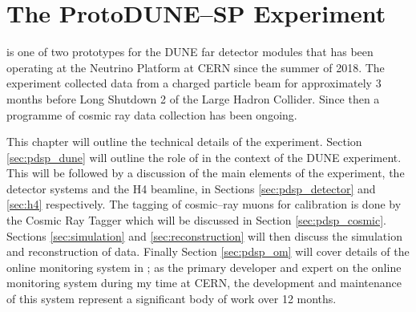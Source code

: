 \chapter{\label{ch:protodune}The ProtoDUNE--SP Experiment} 

\minitoc

%
% 

\protodune{} is one of two prototypes for the DUNE far detector modules that has
been operating at the Neutrino Platform at CERN since the summer of 2018. The
experiment collected data from a charged particle beam for approximately 3 
months before Long Shutdown 2 of the Large Hadron Collider. Since then a 
programme of cosmic ray data collection has been ongoing.

This chapter will outline the technical details of the \protodune{} experiment.
Section \ref{sec:pdsp_dune} will outline the role of \protodune{} in the context
of the DUNE experiment. This will be followed by a discussion of the main
elements of the experiment, the \protodune{} detector systems and the H4
beamline, in Sections \ref{sec:pdsp_detector} and \ref{sec:h4} respectively.
The tagging of cosmic--ray muons for calibration is done by the Cosmic Ray
Tagger which will be discussed in Section \ref{sec:pdsp_cosmic}. Sections
\ref{sec:simulation} and \ref{sec:reconstruction} will then discuss the 
simulation and reconstruction of \protodune{} data. Finally Section 
\ref{sec:pdsp_om} will cover details of the online monitoring system in 
\protodune{}; as the primary developer and expert on the \protodune{} online 
monitoring system during my time at CERN, the development and maintenance of 
this system represent a significant body of work over 12 months.  

